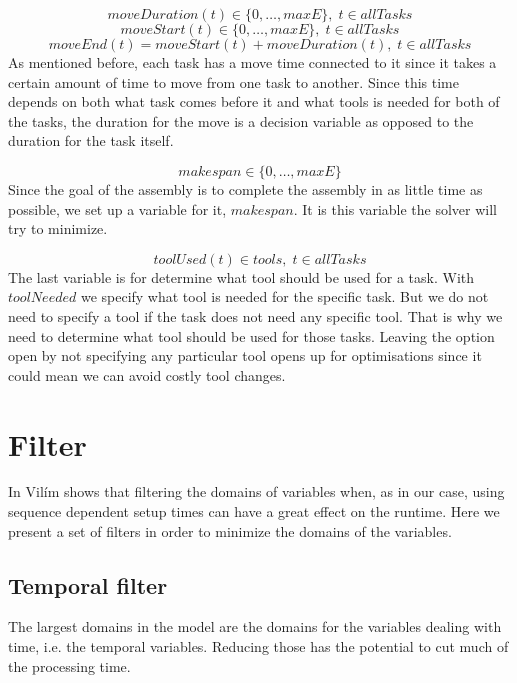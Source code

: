 \begin{equation}\label{eq:49}
 moveDuration(t) \in \{0 , \ldots , maxE\}, \; t \in allTasks
 \end{equation}
 \begin{equation}\label{eq:50}
 moveStart(t) \in \{0 , \ldots , maxE\}, \; t \in allTasks
 \end{equation}
 \begin{equation}\label{eq:51}
 moveEnd(t) = moveStart(t) + moveDuration(t), \; t \in allTasks
 \end{equation}
As mentioned before, each task has a move time connected to it since it takes a certain amount of time to move from one task to another. Since this time depends on both what task comes before it and what tools is needed for both of the tasks, the duration for the move is a decision variable as opposed to the duration for the task itself.
 
 \begin{equation}\label{eq:48}
 makespan \in \{0 , \ldots , maxE\}\end{equation}
Since the goal of the assembly is to complete the assembly in as little time as possible, we set up a variable for it, $makespan$. It is this variable the solver will try to minimize.
 
 \begin{equation}\label{eq:52}
 toolUsed(t) \in tools, \; t \in allTasks\end{equation}
The last variable is for determine what tool should be used for a task. With $toolNeeded$ we specify what tool is needed for the specific task. But we do not need to specify a tool if the task does not need any specific tool. That is why we need to determine what tool should be used for those tasks. Leaving the option open by not specifying any particular tool opens up for optimisations since it could mean we can avoid costly tool changes.
 
 
 \section{Filter}
 In \cite{VilimBartak2002Batch} \cite{Vilim2002Precedence} \cite{VilimBartak2002Sequence} Vilím shows that filtering the domains of variables when, as in our case, using sequence dependent setup times can have a great effect on the runtime. Here we present a set of filters in order to minimize the domains of the variables.
 \subsection{Temporal filter}
 The largest domains in the model are the domains for the variables dealing with time, i.e. the temporal variables. Reducing those has the potential to cut much of the processing time.
 
